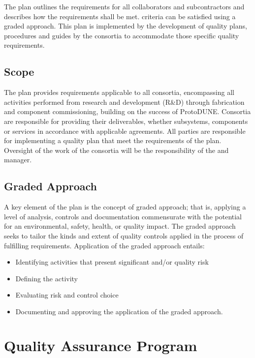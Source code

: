 The   plan outlines the 
requirements for all  collaborators and
subcontractors and describes how the requirements shall be met.
 criteria can be satisfied using a graded approach. This
 plan is implemented by the development of quality plans,
procedures and guides by the consortia to accommodate those specific
quality requirements.

\subsection{Scope}

The   plan provides 
requirements applicable to all consortia, encompassing all activities
performed from research and development (R\&D) through fabrication and
component commissioning, building on the success of
ProtoDUNE. Consortia are responsible for providing their deliverables,
whether subsystems, components or services in accordance with
applicable agreements. All parties are responsible for
implementing a quality plan that meet the requirements of the
  plan. Oversight of the work of
the consortia will be the responsibility of the 
 and  
manager.

\subsection{Graded Approach}

A key element of the   plan is the
concept of graded approach; that is, applying a level of analysis,
controls and documentation commensurate with the potential for an
environmental, safety, health, or quality impact. The graded approach
seeks to tailor the kinds and extent of quality controls applied in
the process of fulfilling requirements. Application of the graded
approach entails:
\begin{itemize}
  \item Identifying activities that present significant 
    and/or quality risk
  \item Defining the activity
  \item Evaluating risk and control choice
  \item Documenting and approving the application of the graded
    approach.
\end{itemize}

\section{Quality Assurance Program}

